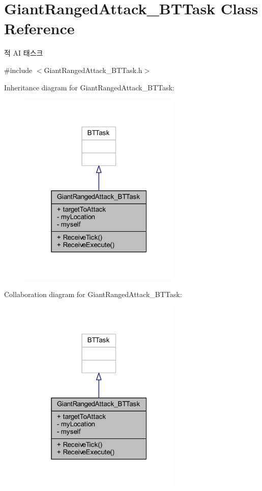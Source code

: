 \hypertarget{class_giant_ranged_attack___b_t_task}{}\section{Giant\+Ranged\+Attack\+\_\+\+B\+T\+Task Class Reference}
\label{class_giant_ranged_attack___b_t_task}


적 AI 태스크  




{\ttfamily \#include $<$Giant\+Ranged\+Attack\+\_\+\+B\+T\+Task.\+h$>$}



Inheritance diagram for Giant\+Ranged\+Attack\+\_\+\+B\+T\+Task\+:
\nopagebreak
\begin{figure}[H]
\begin{center}
\leavevmode
\includegraphics[width=220pt]{class_giant_ranged_attack___b_t_task__inherit__graph}
\end{center}
\end{figure}


Collaboration diagram for Giant\+Ranged\+Attack\+\_\+\+B\+T\+Task\+:
\nopagebreak
\begin{figure}[H]
\begin{center}
\leavevmode
\includegraphics[width=220pt]{class_giant_ranged_attack___b_t_task__coll__graph}
\end{center}
\end{figure}
